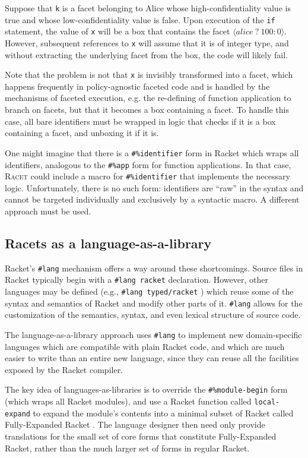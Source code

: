 \documentclass{article}
\begin{document}
Suppose that \texttt{k} is a facet belonging to Alice whose high-confidentiality value is true and whose low-confidentiality value is false. Upon execution of the \texttt{if} statement, the value of \texttt{x} will be a box that contains the facet $\langle \textit{alice}\ ?\ 100 : 0 \rangle$. However, subsequent references to \texttt{x} will assume that it is of integer type, and without extracting the underlying facet from the box, the code will likely fail.

Note that the problem is not that \texttt{x} is invisibly transformed into a facet, which happens frequently in policy-agnostic faceted code and is handled by the mechanisms of faceted execution, e.g. the re-defining of function application to branch on facets, but that it becomes a box containing a facet. To handle this case, all bare identifiers must be wrapped in logic that checks if it is a box containing a facet, and unboxing it if it is.

One might imagine that there is a \texttt{\#\%identifier} form in Racket which wraps all identifiers, analogous to the \texttt{\#\%app} form for function applications. In that case, \textsc{Racet} could include a macro for \texttt{\#\%identifier} that implements the necessary logic. Unfortunately, there is no such form: identifiers are ``raw'' in the syntax and cannot be targeted individually and exclusively by a syntactic macro. A different approach must be used.


\subsection{Racets as a language-as-a-library}
Racket's \texttt{\#lang} mechanism offers a way around these shortcomings. Source files in Racket typically begin with a \texttt{\#lang racket} declaration. However, other languages may be defined (e.g., \texttt{\#lang typed/racket} \cite{typed-racket}) which reuse some of the syntax and semantics of Racket and modify other parts of it. \texttt{\#lang} allows for the customization of the semantics, syntax, and even lexical structure of source code.

The language-as-a-library approach \cite{lang-as-lib} uses \texttt{\#lang} to implement new domain-specific languages which are compatible with plain Racket code, and which are much easier to write than an entire new language, since they can reuse all the facilities exposed by the Racket compiler.

The key idea of languages-as-libraries is to override the \texttt{\#\%module-begin} form (which wraps all Racket modules), and use a Racket function called \texttt{local-expand} to expand the module's contents into a minimal subset of Racket called Fully-Expanded Racket \cite{fe-racket}. The language designer then need only provide translations for the small set of core forms that constitute Fully-Expanded Racket, rather than the much larger set of forms in regular Racket.
\end{document}
